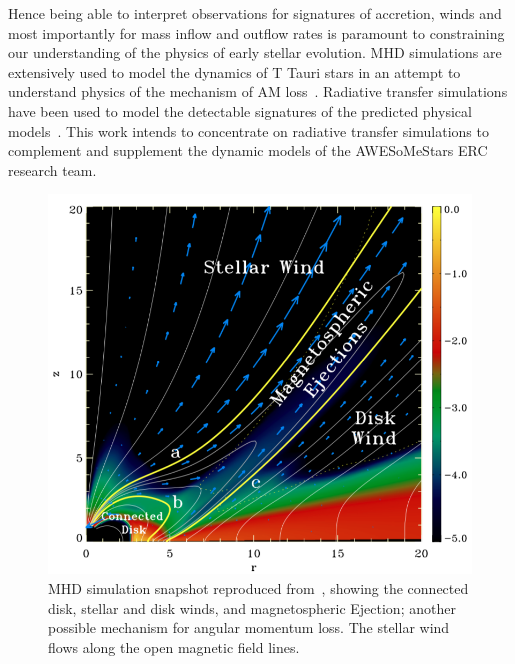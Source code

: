 \documentclass[fleqn,usenatbib]{mnras}
\begin{document}
Hence being able to interpret observations for signatures of accretion, winds and most importantly for mass inflow and outflow rates is paramount to constraining our understanding of the physics of early stellar evolution. MHD simulations are extensively used to model the dynamics of T Tauri stars in an attempt to understand physics of the mechanism of AM loss~\citep[e.g.][]{2009A&A...508.1117Z,Matt:2008bj,2019A&A...624A..31C,Romanova:2002hc}. Radiative transfer simulations have been used to model the detectable signatures of the predicted physical models~\citep[e.g.][]{Esau:2014is,2012MNRAS.426.2901K,Kurosawa:2011fh,1998AJ....116..455M,Hartmann:1994tl}. This work intends to concentrate on radiative transfer simulations to complement and supplement the dynamic models of the AWESoMeStars ERC research team.
\begin{figure}
    \centering
    \includegraphics[width=\linewidth]{figures/zanni}
    \caption{MHD simulation snapshot reproduced from~\citet{2009A&A...508.1117Z}, showing the connected disk, stellar and disk winds, and magnetospheric Ejection; another possible mechanism for angular momentum loss. The stellar wind flows along the open magnetic field lines.}
    \label{fig:zanni}
\end{figure}
\end{document}
